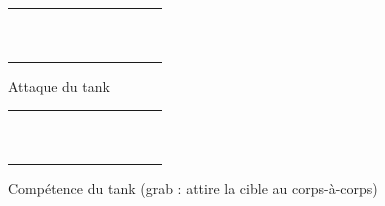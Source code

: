 \documentclass[a4paper]{scrreprt}
\begin{document}
\begin{figure}
    \centering
    \begin{tabular}{|c|c|c|c|c|c|c|c|c|c|c|}
        \hline
        &&&&&&&&&&\\ \hline  
        &&&&&&&&&&\\ \hline 
        &&&&&&&&&&\\ \hline
        &&&&&&&&&&\\ \hline
        &&&&\cellcolor{cred}&\cellcolor{cred}&\cellcolor{cred}&&&&\\ \hline
        &&&&\cellcolor{cred}&\cellcolor{yellow}&\cellcolor{cred}&&&&\\ \hline
        &&&&\cellcolor{cred}&\cellcolor{cred}&\cellcolor{cred}&&&&\\ \hline
        &&&&&&&&&&\\ \hline
        &&&&&&&&&&\\ \hline
        &&&&&&&&&&\\ \hline
        &&&&&&&&&&\\ \hline
        
    \end{tabular}
    \caption{Attaque du tank}
    \label{fig:tankatt}
\end{figure}

\begin{figure}
    \centering
    \begin{tabular}{|c|c|c|c|c|c|c|c|c|c|c|}
        \hline
        &&&&&&&&&&\\ \hline  
        &&&&&&&&&&\\ \hline 
        &&&&&\cellcolor{cgreen}&&&&&\\ \hline
        &&&&&\cellcolor{cgreen}&&&&&\\ \hline
        &&&&&&&&&&\\ \hline
        &&\cellcolor{cgreen}&\cellcolor{cgreen}&&\cellcolor{yellow}&&\cellcolor{cgreen}&\cellcolor{cgreen}&&\\ \hline
        &&&&&&&&&&\\ \hline
        &&&&&\cellcolor{cgreen}&&&&&\\ \hline
        &&&&&\cellcolor{cgreen}&&&&&\\ \hline
        &&&&&&&&&&\\ \hline
        &&&&&&&&&&\\ \hline
        
    \end{tabular}
    \caption{Compétence du tank (grab : attire la cible au corps-à-corps)}
    \label{fig:tankcomp}
\end{figure}
\end{document}
